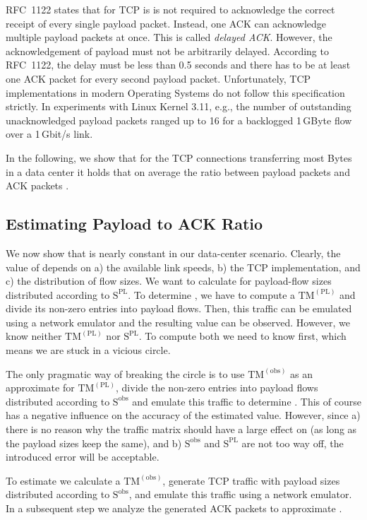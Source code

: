 \documentclass[journal,10pt]{IEEEtran}
\newcommand{\obstm}{\ensuremath{\mathrm{TM}^{(\mathrm{obs})}}}
\newcommand{\pltm}{\ensuremath{\mathrm{TM}^{(\mathrm{PL})}}}
\newcommand{\size}[1]{\ensuremath{\mathrm{S}  ^{\mathrm{#1}}}}
\begin{document}
	
	RFC~1122 \cite{rfc1122} states that for TCP is is not required to acknowledge the correct receipt of every single payload packet. 
	Instead, one ACK can acknowledge multiple payload packets at once.
	This is called \emph{delayed ACK}. However, the acknowledgement of payload must not be arbitrarily delayed.
	According to RFC~1122, the delay must be less than 0.5 seconds and 
	there has to be at least one ACK packet for every second payload packet.
Unfortunately, TCP implementations in modern Operating Systems do not follow this specification strictly.
	In experiments with Linux Kernel 3.11, e.g., the number of outstanding unacknowledged payload packets ranged up to 16 for a
	backlogged 1\,GByte flow over a 1\,Gbit/s link.
	
	In the following, we show that for the TCP connections transferring most Bytes in a data center it holds that on average 
	the ratio between payload packets and ACK packets .
	


\subsection{Estimating Payload to ACK Ratio}
\label{sec:payloadtoackratio}

	We now show that  is nearly constant in our data-center scenario.
	Clearly, the value of  depends on a) the available link speeds, b) the TCP implementation, and c) the distribution of flow sizes.
	We want to calculate  for payload-flow sizes distributed according to \size{PL}.
	To determine , we have to compute a \pltm{} and divide its non-zero entries into payload flows. 
	Then, this traffic can be emulated using a network emulator and
	the resulting  value can be observed. However, we know neither \pltm{} nor \size{PL}. 
	To compute both we need to know  first, which means we are stuck in a vicious circle.
	
	The only pragmatic way of breaking the circle is to use \obstm{} as an approximate for \pltm{},
	divide the non-zero entries into payload flows distributed according to \size{obs} and emulate this traffic to determine .
	This of course has a negative influence on the accuracy of the estimated  value.
	However, since a) there is no reason why the traffic matrix should have a large effect on  (as long as the payload sizes keep the same),
	and b) \size{obs} and \size{PL} are not too way off, the introduced error will be acceptable.

	To estimate  we calculate a \obstm{}, 
	generate TCP traffic with payload sizes distributed according to \size{obs},
	and emulate this traffic using a network emulator.
	In a subsequent step we analyze the generated ACK packets to approximate .
	
\end{document}
